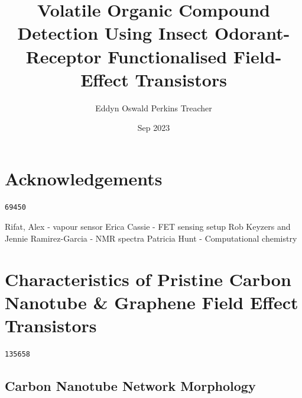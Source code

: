 \documentclass[
  a4paper,
]{scrbook}
\title{Volatile Organic Compound Detection Using Insect Odorant-Receptor
Functionalised Field-Effect Transistors}
\author{Eddyn Oswald Perkins Treacher}
\date{Sep 2023}
\begin{document}
\frontmatter
\maketitle
\ifdefined\Shaded\renewenvironment{Shaded}{\begin{tcolorbox}[boxrule=0pt, sharp corners, borderline west={3pt}{0pt}{shadecolor}, interior hidden, breakable, enhanced, frame hidden]}{\end{tcolorbox}}\fi

\mainmatter
{}

\hypertarget{acknowledgements}{%
\chapter*{Acknowledgements}\label{acknowledgements}}


\begin{verbatim}
69450
\end{verbatim}

Rifat, Alex - vapour sensor Erica Cassie - FET sensing setup Rob Keyzers
and Jennie Ramirez-Garcia - NMR spectra Patricia Hunt - Computational
chemistry


\hypertarget{characteristics-of-pristine-carbon-nanotube-graphene-field-effect-transistors}{%
\chapter{Characteristics of Pristine Carbon Nanotube \& Graphene Field
Effect
Transistors}\label{characteristics-of-pristine-carbon-nanotube-graphene-field-effect-transistors}}

\begin{verbatim}
135658
\end{verbatim}

\hypertarget{sec-pristine-morphology}{%
\section{Carbon Nanotube Network
Morphology}\label{sec-pristine-morphology}}
\end{document}

